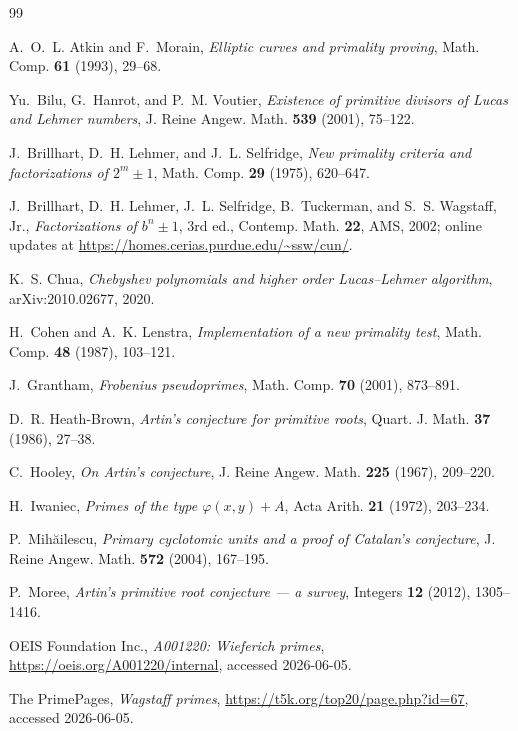 \documentclass[11pt]{amsart}
\theoremstyle{plain}
\theoremstyle{definition}
\theoremstyle{remark}
\numberwithin{equation}{section}
\begin{document}
\begin{thebibliography}{99}

 A.~O.~L. Atkin and F.~Morain, \emph{Elliptic curves and primality proving}, Math. Comp. \textbf{61} (1993), 29--68.

 Yu.~Bilu, G.~Hanrot, and P.~M. Voutier, \emph{Existence of primitive divisors of Lucas and Lehmer numbers}, J. Reine Angew. Math. \textbf{539} (2001), 75--122.

 J.~Brillhart, D.~H. Lehmer, and J.~L. Selfridge, \emph{New primality criteria and factorizations of $2^m \pm 1$}, Math. Comp. \textbf{29} (1975), 620--647.

 J.~Brillhart, D.~H. Lehmer, J.~L. Selfridge, B.~Tuckerman, and S.~S. Wagstaff, Jr., \emph{Factorizations of $b^n \pm 1$}, 3rd ed., Contemp. Math. \textbf{22}, AMS, 2002; online updates at \url{https://homes.cerias.purdue.edu/~ssw/cun/}.

 K.~S. Chua, \emph{Chebyshev polynomials and higher order Lucas--Lehmer algorithm}, arXiv:2010.02677, 2020.

 H.~Cohen and A.~K. Lenstra, \emph{Implementation of a new primality test}, Math. Comp. \textbf{48} (1987), 103--121.

 J.~Grantham, \emph{Frobenius pseudoprimes}, Math. Comp. \textbf{70} (2001), 873--891.

 D.~R. Heath-Brown, \emph{Artin's conjecture for primitive roots}, Quart. J. Math. \textbf{37} (1986), 27--38.

 C.~Hooley, \emph{On Artin's conjecture}, J. Reine Angew. Math. \textbf{225} (1967), 209--220.

 H.~Iwaniec, \emph{Primes of the type $\varphi(x,y)+A$}, Acta Arith. \textbf{21} (1972), 203--234.

 P.~Mih{\u a}ilescu, \emph{Primary cyclotomic units and a proof of Catalan's conjecture}, J. Reine Angew. Math. \textbf{572} (2004), 167--195.

 P.~Moree, \emph{Artin's primitive root conjecture --- a survey}, Integers \textbf{12} (2012), 1305--1416.

 OEIS Foundation Inc., \emph{A001220: Wieferich primes}, \url{https://oeis.org/A001220/internal}, accessed 2026-06-05.

 The PrimePages, \emph{Wagstaff primes}, \url{https://t5k.org/top20/page.php?id=67}, accessed 2026-06-05.


\end{thebibliography}
\end{document}
